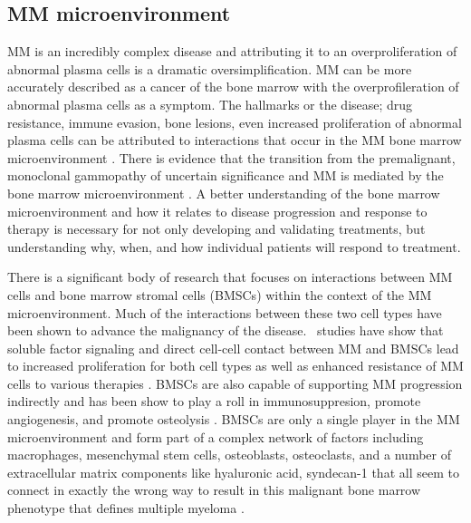 \subsection{MM microenvironment}
MM is an incredibly complex disease and attributing it to an overproliferation of abnormal plasma cells is a dramatic oversimplification. MM can be more accurately described as a cancer of the bone marrow with the overprofileration of abnormal plasma cells as a symptom. The hallmarks or the disease; drug resistance, immune evasion, bone lesions, even increased proliferation of abnormal plasma cells can be attributed to interactions that occur in the MM bone marrow microenvironment \cite{Damiano2000, Raab2009, Tai2006, Groen2011}. There is evidence that the transition from the premalignant, monoclonal gammopathy of uncertain significance and MM is mediated by the bone marrow microenvironment \cite{Balakumaran2010, Ribatti2014}. A better understanding of the bone marrow microenvironment and how it relates to disease progression and response to therapy is necessary for not only developing and validating treatments, but understanding why, when, and how individual patients will respond to treatment.

There is a significant body of research that focuses on interactions between MM cells and bone marrow stromal cells (BMSCs) within the context of the MM microenvironment. Much of the interactions between these two cell types have been shown to advance the malignancy of the disease. \Invitro\ studies have show that soluble factor signaling and direct cell-cell contact between MM and BMSCs lead to increased proliferation for both cell types as well as enhanced resistance of MM cells to various therapies \cite{Chauhan1996, Hideshima2002, Abdi2013}. BMSCs are also capable of supporting MM progression indirectly and has been show to play a roll in immunosuppresion, promote angiogenesis, and promote osteolysis \cite{Tai2006, Vallet2010, Ribatti2006}. BMSCs are only a single player in the MM microenvironment and form part of a complex network of factors including macrophages, mesenchymal stem cells, osteoblasts, osteoclasts, and a number of extracellular matrix components like hyaluronic acid, syndecan-1 that all seem to connect in exactly the wrong way to result in this malignant bone marrow phenotype that defines multiple myeloma \cite{Azab2009, Chatterjee2002a, Vincent2005, Lin2007, Lamorte2012, Reagan2012, Maxwell2005}. 

